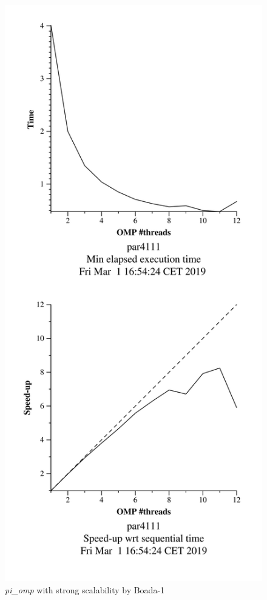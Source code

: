 \documentclass[12]{article}
\begin{document}
\begin{figure}[H]
\centering
\includegraphics[scale=0.15]{images/pi_omp-1000000000-1-12-3-strong-boada-1.png}
 \caption{ \textit{pi\_omp} with strong scalability by Boada-1}
  \label{fig:pi_strong_ompboada1}
\end{figure}
\end{document}

